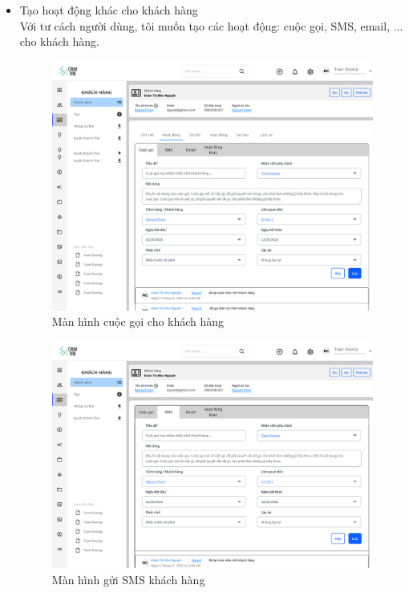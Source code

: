 \documentclass[12pt,a4paper]{article}
\begin{document}
\begin{enumerate}
\begin{itemize}
            \item Tạo hoạt động khác cho khách hàng \\
            Với tư cách người dùng, tôi muốn tạo các hoạt động: cuộc gọi, SMS, email, ... cho khách hàng.

            \begin{figure}[H]
                \centering \includegraphics[width=\textwidth]{Img/Nguyet/Khachhang/cuocgoiKH.png}
                \vspace{0.5cm}
                \caption{Màn hình cuộc gọi cho khách hàng}
                \label{taocuocgoiKH}
            \end{figure}

            \begin{figure}[H]
                \centering \includegraphics[width=\textwidth]{Img/Nguyet/Khachhang/SMSKH.png}
                \vspace{0.5cm}
                \caption{Màn hình gửi SMS khách hàng}
                \label{guiSMSKH}
            \end{figure}


\end{itemize}
\end{enumerate}
\end{document}
